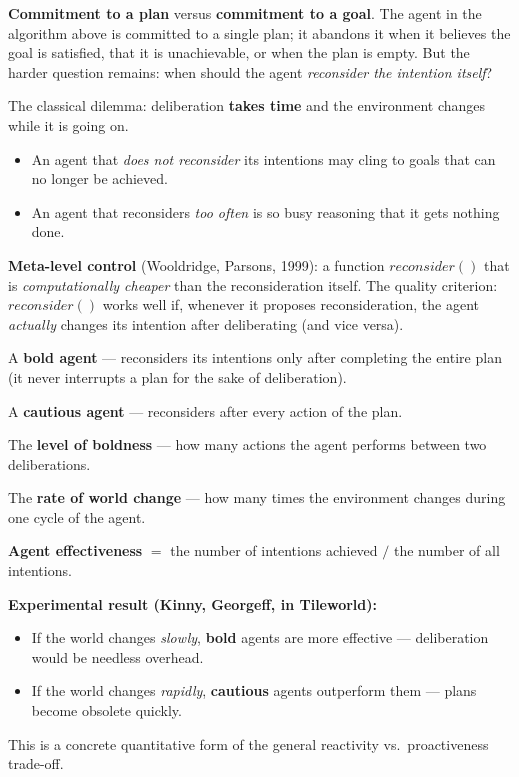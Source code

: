 \documentclass[11pt,a4paper]{article}
\theoremstyle{definition}
\begin{document}
\textbf{Commitment to a plan} versus \textbf{commitment to a goal}. The agent in the algorithm above
is committed to a single plan; it abandons it when it believes the goal is satisfied, that it is
unachievable, or when the plan is empty. But the harder question remains: when should the agent
\emph{reconsider the intention itself}?

The classical dilemma: deliberation \textbf{takes time} and the environment changes while it is
going on.
\begin{itemize}
\item An agent that \emph{does not reconsider} its intentions may cling to goals that can no longer
  be achieved.
\item An agent that reconsiders \emph{too often} is so busy reasoning that it gets nothing done.
\end{itemize}

\textbf{Meta-level control} (Wooldridge, Parsons, 1999): a function $\mathit{reconsider}()$ that is
\emph{computationally cheaper} than the reconsideration itself. The quality criterion:
$\mathit{reconsider}()$ works well if, whenever it proposes reconsideration, the agent
\emph{actually} changes its intention after deliberating (and vice versa).

\begin{defbox}
A \textbf{bold agent} --- reconsiders its intentions only after completing the entire plan (it never
interrupts a plan for the sake of deliberation).

A \textbf{cautious agent} --- reconsiders after every action of the plan.

The \textbf{level of boldness} --- how many actions the agent performs between two deliberations.

The \textbf{rate of world change} --- how many times the environment changes during one cycle of the
agent.

\textbf{Agent effectiveness} $=$ the number of intentions achieved $/$ the number of all intentions.
\end{defbox}

\textbf{Experimental result (Kinny, Georgeff, in Tileworld):}
\begin{itemize}
\item If the world changes \emph{slowly}, \textbf{bold} agents are more effective --- deliberation
  would be needless overhead.
\item If the world changes \emph{rapidly}, \textbf{cautious} agents outperform them --- plans become
  obsolete quickly.
\end{itemize}
This is a concrete quantitative form of the general reactivity vs.\ proactiveness trade-off.
\end{document}
